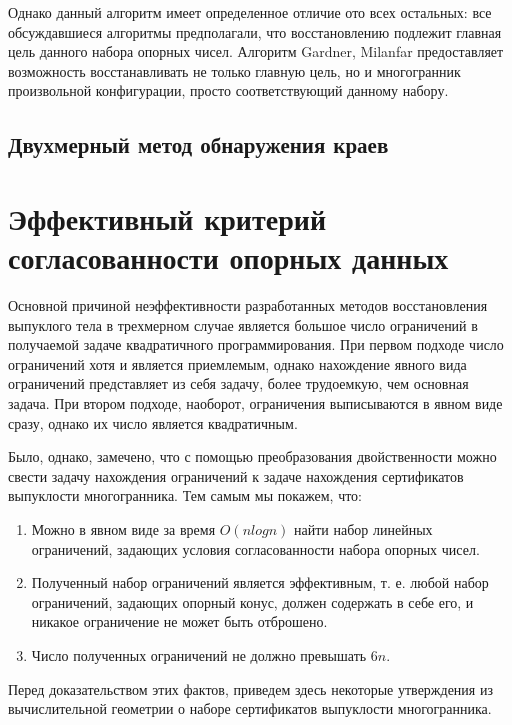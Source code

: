 \documentclass[a4paper, 12pt, titlepage]{article}
\theoremstyle{definition}
\theoremstyle{plain}
\theoremstyle{plain}
\begin{document}
Однако данный алгоритм имеет определенное отличие ото всех остальных: все
обсуждавшиеся алгоритмы предполагали, что восстановлению подлежит главная
цель данного набора опорных чисел. Алгоритм Gardner, Milanfar предоставляет
возможность восстанавливать не только главную цель, но и многогранник
произвольной конфигурации, просто соответствующий данному набору.

\subsection{Двухмерный метод обнаружения краев}



\newpage
\section{Эффективный критерий согласованности опорных данных}

Основной причиной неэффективности разработанных методов восстановления
выпуклого тела в трехмерном случае является большое число ограничений в
получаемой задаче квадратичного программирования. При первом подходе число
ограничений хотя и является приемлемым, однако нахождение явного вида
ограничений представляет из себя задачу, более трудоемкую, чем основная задача.
При втором подходе, наоборот, ограничения выписываются в явном виде сразу,
однако их число является квадратичным.

Было, однако, замечено, что с помощью преобразования двойственности можно
свести задачу нахождения ограничений к задаче нахождения сертификатов
выпуклости многогранника. Тем самым мы покажем, что:

\begin{enumerate}
 \item Можно в явном виде за время $O(n log n)$ найти набор линейных
ограничений, задающих условия согласованности набора опорных чисел.
 \item Полученный набор ограничений является эффективным, т. е. любой набор
ограничений, задающих опорный конус, должен содержать в себе его, и никакое
ограничение не может быть отброшено.
 \item Число полученных ограничений не должно превышать $6 n$.
\end{enumerate}

Перед доказательством этих фактов, приведем здесь некоторые утверждения из
вычислительной геометрии о наборе сертификатов выпуклости многогранника.
\end{document}

